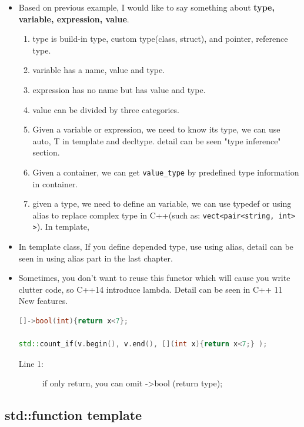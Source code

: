 \documentclass[a4paper,11pt,twoside]{book}
\begin{document}
\begin{itemize}
\begin{enumerate}
\end{enumerate}

\item Based on previous example, I would like to say something about \textbf{type, variable, expression, value}.
\begin{enumerate}
	\item type is build-in type, custom type(class, struct), and pointer, reference type.
	\item variable has a name, value and type.
	\item expression has no name but has value and type.
	\item value can be divided by three categories.
	\item Given a variable or expression, we need to know its type, we can use auto, T in template and decltype. detail can be seen "type inference" section.
	
	\item Given a container, we can get \texttt{value\_type} by predefined type information in container.
	
	\item given a type, we need to define an variable, we can use typedef or using alias to replace complex type in C++(such as: \texttt{vect<pair<string, int> >}). In template,

\end{enumerate}

\item In template class, If you define depended type, use using alias, detail can be seen in using alias part in the last chapter.

\item Sometimes, you don't want to reuse this functor which will cause you write clutter code, so C++14 introduce lambda.  Detail can be seen in C++ 11 New features.
\begin{lstlisting}[frame=single, language=c++]
 []->bool(int){return x<7};

std::count_if(v.begin(), v.end(), [](int x){return x<7;} );
\end{lstlisting}
\begin{description}
	\item[Line 1:]  if only return, you can omit ->bool (return type);
\end{description}

\end{itemize}

\subsection{std::function template}
\end{document}
